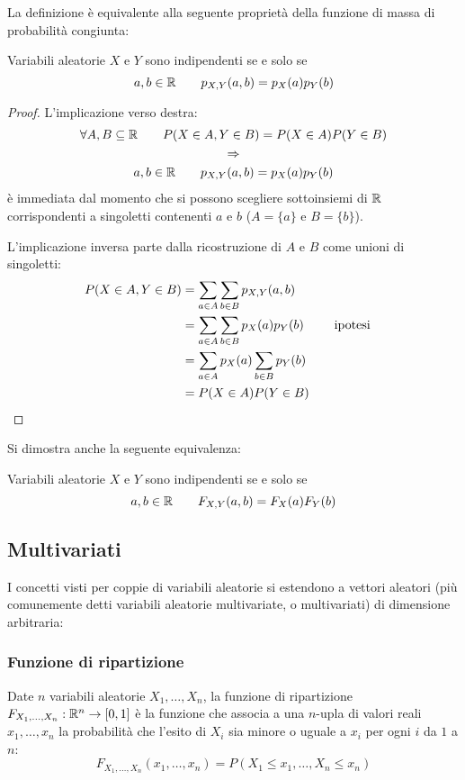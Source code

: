 La definizione è equivalente alla seguente proprietà della funzione di massa di probabilità congiunta:
\begin{prop}
	Variabili aleatorie $X$ e $Y$ sono indipendenti se e solo se
	\begin{equation*}
		a,b\in\mathbb R\qquad p_{X,Y}(a,b)=p_X(a)p_Y(b)
	\end{equation*}
\end{prop}
\begin{proof}
	L'implicazione verso destra:
	\begin{gather*}
		\forall A,B\subseteq\mathbb R\qquad P(X\in A, Y\in B)=P(X\in A)P(Y\in B) \\
		\Rightarrow \\
		a,b\in\mathbb R\qquad p_{X,Y}(a,b)=p_X(a)p_Y(b)
	\end{gather*}
	è immediata dal momento che si possono scegliere sottoinsiemi di $\mathbb R$ corrispondenti a singoletti contenenti $a$ e $b$ ($A=\{a\}$ e $B=\{b\}$).

	L'implicazione inversa parte dalla ricostruzione di $A$ e $B$ come unioni di singoletti:
	\begin{align*}
		P(X\in A, Y\in B) & = \sum_{a\in A}\sum_{b\in B} p_{X,Y}(a,b)              \\
		                  & = \sum_{a\in A}\sum_{b\in B} p_X(a)p_Y(b) & \quad & \text{ipotesi} \\
		                  & = \sum_{a\in A}p_X(a) \sum_{b\in B} p_Y(b)             \\
		                  & = P(X\in A)P(Y\in B)
	\end{align*}
\end{proof}

Si dimostra anche la seguente equivalenza:
\begin{prop}
	Variabili aleatorie $X$ e $Y$ sono indipendenti se e solo se
	\begin{equation*}
		a,b\in\mathbb R\qquad F_{X,Y}(a,b)=F_X(a)F_Y(b)
	\end{equation*}
\end{prop}



\subsection{Multivariati}
I concetti visti per coppie di variabili aleatorie si estendono a vettori aleatori (più comunemente detti variabili aleatorie multivariate, o multivariati) di dimensione arbitraria:


\subsubsection{Funzione di ripartizione}
\begin{defin}
	Date $n$ variabili aleatorie $X_1, \dots, X_n$, la funzione di ripartizione $F_{X_1,\dots,X_n}:\mathbb R^n\to[0,1]$ è la funzione che associa a una $n$-upla di valori reali $x_1,\dots,x_n$ la probabilità che l'esito di $X_i$ sia minore o uguale a $x_i$ per ogni $i$ da $1$ a $n$:
	\begin{equation*}
		F_{X_1,\dots,X_n}(x_1,\dots,x_n) = P(X_1\leq x_1,\dots,X_n\leq x_n)
	\end{equation*}
\end{defin}


